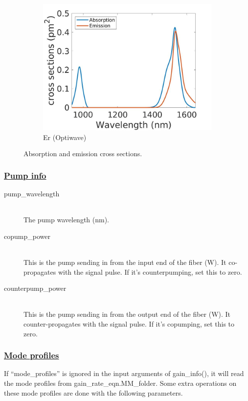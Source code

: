 \documentclass[12pt,hidelinks]{book}
\begin{document}
\begin{description}
\begin{figure}[h!]
\begin{subfigure}{0.3\textwidth}
\includegraphics[width=\textwidth]{Er (optiwave).jpg}
\caption{Er (Optiwave)}
\end{subfigure}
\caption{Absorption and emission cross sections.}
\end{figure}
\end{description}

\subsubsection{\underline{Pump info}}
\begin{description}
\item[\color{blue}pump\_wavelength]\mbox{}\\
The pump wavelength (\si{\nm}).

\item[\color{blue}copump\_power]\mbox{}\\
This is the pump sending in from the input end of the fiber (\si{\W}). It co-propagates with the signal pulse. If it's counterpumping, set this to zero.

\item[\color{blue}counterpump\_power]\mbox{}\\
This is the pump sending in from the output end of the fiber (\si{\W}). It counter-propagates with the signal pulse. If it's copumping, set this to zero.
\end{description}

\subsubsection{\underline{Mode profiles}}
If ``mode\_profiles'' is ignored in the input arguments of gain\_info(), it will read the mode profiles from gain\_rate\_eqn.MM\_folder. Some extra operations on these mode profiles are done with the following parameters.
\end{document}
